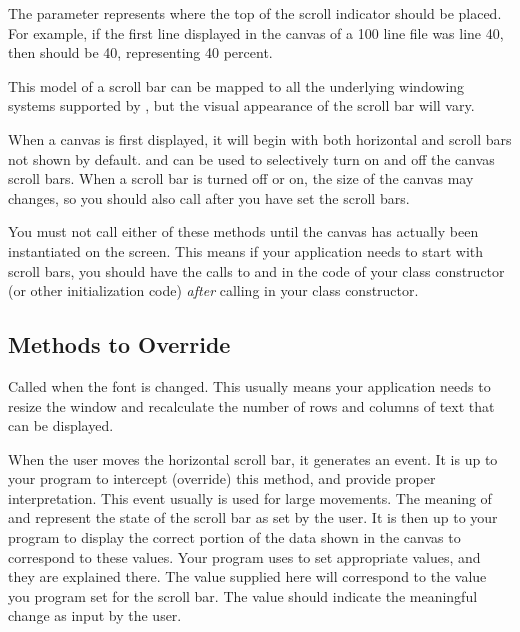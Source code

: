 The  parameter represents where the top of
the scroll indicator should be placed.  For example,
if the first line displayed in the canvas of a 100 line file
was line 40, then   should be 40, representing
40 percent.

This model of a scroll bar can be mapped to all the underlying
windowing systems supported by \V, but the visual appearance
of the scroll bar will vary.


When a canvas is first displayed, it will begin with both
horizontal and scroll bars not shown by default. 
and  can be used to selectively turn on and off
the canvas scroll bars. When a scroll bar is turned off or on, the size
of the canvas may changes, so you should also call  after
you have set the scroll bars.

You must not call either of these methods until the canvas has
actually been instantiated on the screen. This means if your
application needs to start with scroll bars, you should have
the calls to  and  in
the code of your  class constructor
(or other initialization code) \emph{after} calling
 in your class constructor.

\subsection* {Methods to Override} %


Called when the font is changed. This usually means your
application needs to resize the window and recalculate
the number of rows and columns of text that can be displayed.


When the user moves the horizontal scroll bar, it generates an
 event. It is up to your program to intercept (override)
this method, and provide proper interpretation. This event usually
is used for large movements. The meaning of  and
 represent the state of the scroll bar as set by
the user.  It is then up to your program to display the
correct portion of the data shown in the canvas to correspond
to these values.  Your program uses  to
set appropriate values, and they are explained there.
The  value supplied here
will correspond to the value you program set for the scroll bar.
The  value should indicate the meaningful change as input
by the user.


